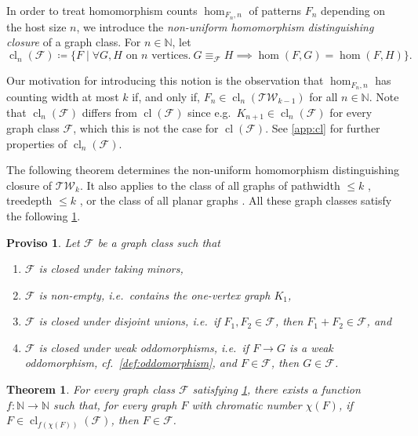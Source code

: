 \documentclass[11pt, DIV=15]{scrarticle}
\theoremstyle{definition}
\theoremstyle{plain}
\newtheorem{theorem}[definition]{Theorem}
\newtheorem{proviso}[definition]{Proviso}
\theoremstyle{remark}
\DeclareMathOperator{\cl}{cl}
\begin{document}
	In order to treat homomorphism counts $\hom_{F_n, n}$ of patterns $F_n$ depending on the host size $n$,
	we introduce the \emph{non-uniform homomorphism distinguishing closure} of a graph class.
	For $n \in \mathbb{N}$, let
	\[
		\cl_n(\mathcal{F}) \coloneqq \{F \mid \forall G, H \text{ on $n$ vertices}.\ G \equiv_{\mathcal{F}} H \implies \hom(F, G) = \hom(F, H)\}.
	\]

	Our motivation for introducing this notion is the observation that 
	$\hom_{F_n, n}$ has counting width at most $k$
	if, and only if,
	$F_n \in \cl_n(\mathcal{TW}_{k-1})$ for all $n \in \mathbb{N}$.
	Note that $\cl_n(\mathcal{F})$ differs from $\cl(\mathcal{F})$
	since e.g.\ $K_{n+1} \in \cl_n(\mathcal{F})$ for every graph class $\mathcal{F}$,
	which this is not the case for $\cl(\mathcal{F})$.
	See \cref{app:cl} for further properties of $\cl_n(\mathcal{F})$.
	
	The following theorem
	determines the non-uniform homomorphism distinguishing closure
	of $\mathcal{TW}_k$.
	It also applies to the class of all graphs of pathwidth $\leq k$ \cite{seppelt_homomorphism_2024},
	treedepth $\leq k$ \cite{fluck_going_2024},
	or the class of all planar graphs \cite{roberson_oddomorphisms_2022}.
	All these graph classes satisfy the following \cref{proviso}.
	
	\begin{proviso}\label{proviso}
		Let $\mathcal{F}$ be a graph class such that
		\begin{enumerate}
			\item $\mathcal{F}$ is closed under taking minors,
			\item $\mathcal{F}$ is non-empty, i.e.\ contains the one-vertex graph $K_1$,
			\item $\mathcal{F}$ is closed under disjoint unions, i.e.\ if $F_1, F_2 \in \mathcal{F}$, then $F_1 + F_2 \in \mathcal{F}$, and
			\item $\mathcal{F}$ is closed under weak oddomorphisms, i.e.\ if $F \to G$ is a weak oddomorphism, cf.\ \cref{def:oddomorphism}, and $F \in \mathcal{F}$, then $G \in \mathcal{F}$.
		\end{enumerate}
	\end{proviso}

	
	\begin{theorem}\label{lem:non-uniform-closure}
		For every graph class $\mathcal{F}$ satisfying \cref{proviso},
		there exists a function $f \colon \mathbb{N} \to \mathbb{N}$
		such that, 
		for every graph $F$ with chromatic number $\chi(F)$,
		if $F \in \cl_{f(\chi(F))}(\mathcal{F})$, then $F \in \mathcal{F}$.
	\end{theorem}
	
\end{document}
